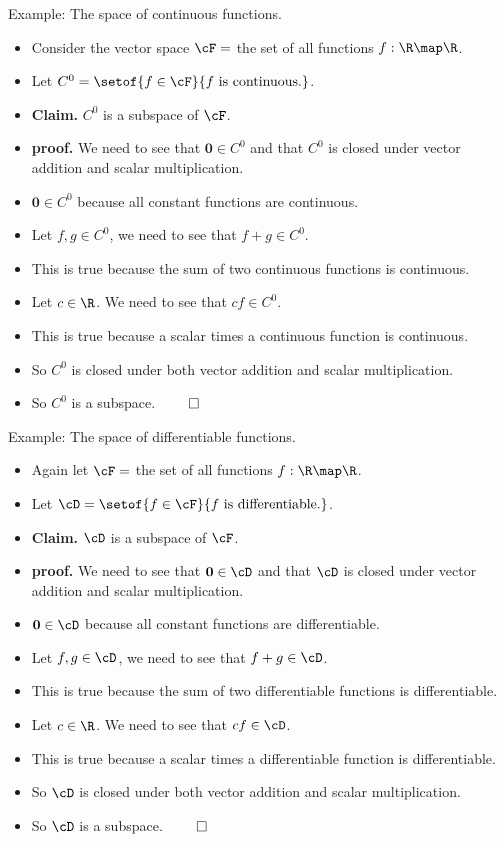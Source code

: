 \documentclass{beamer}
\begin{document}
\begin{frame}{Example: The space of continuous functions.}

\begin{itemize}
\item Consider the vector space $\cF =$ the set of all functions $f:\R\map\R$.
\item Let $C^0 = \setof{f\in\cF}{f \text{ is continuous.}}$.
\item \textbf{Claim.} $C^0$ is a subspace of $\cF$.
\item \textbf{proof.} We need to see that $\textbf{0}\in C^0$ and that
$C^0$ is closed under vector
addition and scalar multiplication.
\item $\textbf{0} \in C^0$ because all constant functions are continuous.
\item Let $f,g\in C^0$, we need to see that $f+g\in C^0$.
\item This is true because the sum of two continuous functions is continuous.
\item Let $c\in \R$. We need to see that $c f \in C^0$.
\item This is true because a scalar times a continuous function is continuous.
\item So $C^0$ is closed under both vector addition and scalar multiplication.
\item So $C^0$ is a subspace. $\qed$
\end{itemize}
\end{frame}

\begin{frame}{Example: The space of differentiable functions.}

\begin{itemize}
\item Again let $\cF =$ the set of all functions $f:\R\map\R$.
\item Let $\cD = \setof{f\in\cF}{f \text{ is differentiable.}}$.
\item \textbf{Claim.} $\cD$ is a subspace of $\cF$.
\item \textbf{proof.} We need to see that $\textbf{0}\in \cD$ and that
$\cD$ is closed under vector
addition and scalar multiplication.
\item $\textbf{0} \in \cD$ because all constant functions are differentiable.
\item Let $f,g\in \cD$, we need to see that $f+g\in \cD$.
\item This is true because the sum of two differentiable functions is differentiable.
\item Let $c\in \R$. We need to see that $c f \in \cD$.
\item This is true because a scalar times a differentiable function is differentiable.
\item So $\cD$ is closed under both vector addition and scalar multiplication.
\item So $\cD$ is a subspace. $\qed$
\end{itemize}
\end{frame}
\end{document}
